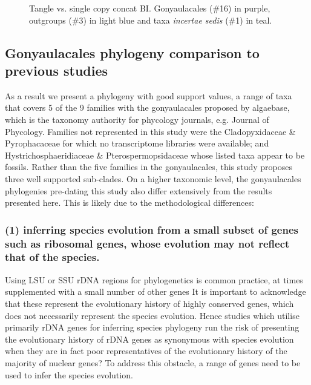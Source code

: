 \documentclass[12pt]{article}
\begin{document}
\FloatBarrier 
\begin{figure} 
\caption{Tangle vs. single copy concat BI. Gonyaulacales (\#16) in purple, outgroups (\#3) in light blue and taxa \textit{incertae sedis} (\#1) in teal.} 
\label{fig:tangleconcatBI}
\end{figure} 
\FloatBarrier
 
\subsection*{Gonyaulacales phylogeny comparison to previous studies} 
As a result we present a phylogeny with good support values, a range of taxa that covers 5 of the 9 families with the gonyaulacales proposed by algaebase, which is the taxonomy authority for phycology journals, e.g. Journal of Phycology. 
Families not represented in this study were the Cladopyxidaceae \& Pyrophacaceae for which no transcriptome libraries were available; and Hystrichosphaeridiaceae \& Pterospermopsidaceae whose listed taxa appear to be fossils.
Rather than the five families in the gonyaulacales, this study proposes three well supported sub-clades. 
On a higher taxonomic level, the gonyaulacales phylogenies pre-dating this study also differ extensively from the results presented here. 
This is likely due to the methodological differences: 
\subsubsection*{(1) inferring species evolution from a small subset of genes such as ribosomal genes, whose evolution may not reflect that of the species.}
Using LSU or SSU rDNA regions for phylogenetics is common practice, at times supplemented with a small number of other genes \cite{shalchian2006combined,zhang2007three,saldarriaga2004molecular,murray2005improving,hoppenrath2010dinoflagellate} 
It is important to acknowledge that these represent the evolutionary history of highly conserved genes, which does not necessarily represent the species evolution. 
Hence studies which utilise primarily rDNA genes for inferring species phylogeny run the risk of presenting the evolutionary history of rDNA genes as synonymous with species evolution when they are in fact poor representatives of the evolutionary history of the majority of nuclear genes?
To address this obstacle, a range of genes need to be used to infer the species evolution.
\end{document}
